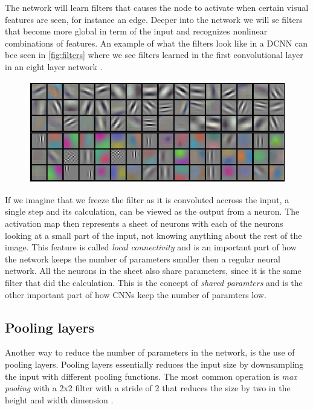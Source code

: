 The network will learn filters that causes the node to activate when certain visual features are seen, for instance an edge. Deeper into the network we will se filters that become more global in term of the input and recognizes nonlinear combinations of features. An example of what the filters look like in a DCNN can bee seen in \autoref{fig:filters} where we see filters learned in the first convolutional layer in an eight layer network \citet{Krizhevsky2012}.

\begin{figure}[H]
	\centering
	\includegraphics[width=\linewidth]{fig/filters.png}
	\label{fig:filters}
\end{figure}
If we imagine that we freeze the filter as it is convoluted accross the input, a single step and its calculation, can be viewed as the output from a neuron. The activation map then represents a sheet of neurons with each of the neurons looking at a small part of the input, not knowing anything about the rest of the image. This feature is called \emph{local connectivity} and is an important part of how the network keeps the number of parameters smaller then a regular neural network. All the neurons in the sheet also share parameters, since it is the same filter that did the calculation. This is the concept of \emph{shared paramters} and is the other important part of how CNNs keep the number of paramters low.

\subsection{Pooling layers}
Another way to reduce the number of parameters in the network, is the use of pooling layers. Pooling layers essentially reduces the input size by downsampling the input with different pooling functions. The most common operation is \emph{max pooling} with a 2x2 filter with a stride of 2 that reduces the size by two in the height and width dimension \citet{Li}. 






















